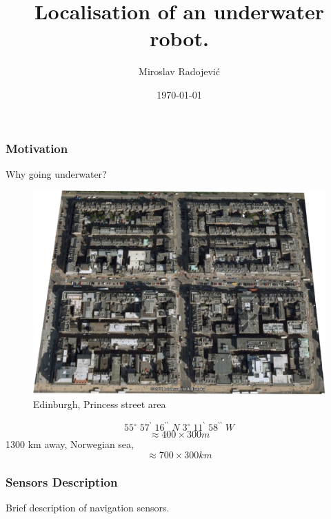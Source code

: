 \documentclass{beamer}
\title[Short title of the talk]{Localisation of an underwater robot.}
\author{Miroslav Radojevi\'{c}}
\institute[Ocean Systems Lab]
{
University of Heriot Watt [Edinburgh] \\
\medskip
{\emph{miroslav.radojevic@gmail.com}}
}
\date{\today}
\begin{document}
%
\begin{frame}
\titlepage
\end{frame}
%
\begin{frame}
\frametitle{Motivation}
\begin{block}
{Why going underwater?}
\begin{figure}
\begin{center}
\includegraphics[width=0.40\linewidth]{images/edinburgh.eps}
\caption{Edinburgh, Princess street area}
\end{center}
\end{figure}
$$ 55^{\circ} \; 57 ^{\backprime} \; 16 ^{\backprime \backprime} \; N \; 3^{\circ} \; 11 ^{\backprime} \; 58 ^{\backprime \backprime} \; W $$ 
$$ \approx 400 \times 300 m $$
1300 km away, Norwegian sea, 
$$ \approx 700 \times 300 km $$
\end{block}
\end{frame}
\begin{frame}
			\frametitle{Sensors Description}

Brief description of navigation sensors.

\end{frame}
\end{document}

